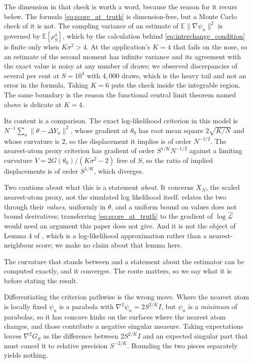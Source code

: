 \documentclass[11pt]{article}
\theoremstyle{definition}
\newcommand{\E}{\mathbb{E}}
\newcommand{\thetao}{\theta_0}
\begin{document}
The dimension in that check is worth a word, because the reason for it recurs below. The formula \eqref{eq:score_at_truth} is dimension-free, but a Monte Carlo check of it is not. The sampling variance of an estimate of $\E\lVert\nabla\psi_n\rVert^2$ is governed by $\E[\rho_S^4]$, which by the calculation behind \eqref{eq:interchange_condition} is finite only when $K\sigma^2>4$. At the application's $K=4$ that fails on the nose, so an estimate of the second moment has infinite variance and its agreement with the exact value is noisy at any number of draws; we observed discrepancies of several per cent at $S=10^4$ with $4{,}000$ draws, which is the heavy tail and not an error in the formula. Taking $K=6$ puts the check inside the integrable region. The same boundary is the reason the functional central limit theorem named above is delicate at $K=4$.

Its content is a comparison. The exact log-likelihood criterion in this model is $N^{-1}\sum_n\lVert\theta-\Delta Y_n\rVert^2$, whose gradient at $\thetao$ has root mean square $2\sqrt{K/N}$ and whose curvature is $2$, so the displacement it implies is of order $N^{-1/2}$. The nearest-atom proxy criterion has gradient of order $S^{1/K}N^{-1/2}$ against a limiting curvature $V=2G(\thetao)/(K\sigma^2-2)$ free of $S$, so the ratio of implied displacements is of order $S^{1/K}$, which diverges.

Two cautions about what this is a statement \emph{about}. It concerns $X_N$, the scaled nearest-atom proxy, not the simulated log likelihood itself.  relates the two through their \emph{values}, uniformly in $\theta$, and a uniform bound on values does not bound derivatives; transferring \eqref{eq:score_at_truth} to the gradient of $\log\widehat{\mathcal L}$ would need an argument this paper does not give. And it is not the object of Lemma 4 of \citet{BrandtSantaClara2002}, which is a log-likelihood approximation rather than a nearest-neighbour score; we make no claim about that lemma here.

The curvature that stands between  and a statement about the estimator can be computed exactly, and it converges. The route matters, so we say what it is before stating the result.

Differentiating the criterion pathwise is the wrong move. Where the nearest atom is locally fixed $\psi_n$ is a parabola with $\nabla^2\psi_n=2S^{2/K}I$, but $\psi_n$ is a \emph{minimum} of parabolas, so it has concave kinks on the surfaces where the nearest atom changes, and those contribute a negative singular measure. Taking expectations leaves $\nabla^2G_S$ as the difference between $2S^{2/K}I$ and an expected singular part that must cancel it to relative precision $S^{-2/K}$. Bounding the two pieces separately yields nothing.
\end{document}
